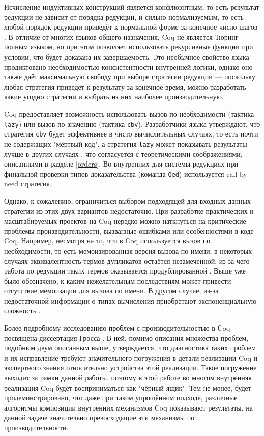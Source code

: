 \documentclass[../diploma.tex]{subfiles}
\begin{document}
Исчисление индуктивных конструкций является конфлюэнтным, то есть результат редукции не зависит от порядка редукции, и сильно нормализуемым, то есть любой порядок редукции приведёт к нормальной форме за конечное число шагов \cite{cic_proofs}. В отличие от многих языков общего назначения, Coq не является Тюринг-полным языком, но при этом позволяет использовать рекурсивные функции при условии, что будет доказана их завершаемость. Это необычное свойство языка продиктовано необходимостью консистентности внутренней логики, однако оно также даёт максимальную свободу при выборе стратегии редукции --- поскольку любая стратегия приведёт к результату за конечное время, можно разработать какие угодно стратегии и выбрать из них наиболее производительную.

Coq предоставляет возможность использовать вызов по необходимости (тактика \\\texttt{lazy}) или вызов по значению (тактика \texttt{cbv}). Разработчики языка утверждают, что стратегия \texttt{cbv} будет эффективнее в чисто вычислительных случаях, то есть почти не содержащих "мёртвый код", а стратегия \texttt{lazy} может показывать результаты лучше в других случаях \cite{coq}, что согласуется с теоретическими соображениями, описанными в разделе \ref{orders}. Во внутренних для системы редукциях при финальной проверки типов доказательства (команда \texttt{Qed}) используется call-by-need стратегия.

Однако, к сожалению, ограничиться выбором подходящей для входных данных стратегии из этих двух вариантов недостаточно. При разработке практических и масштабируемых проектов на Coq нередко можно наткнуться на критические проблемы производительности, вызванные ошибками или особенностями в коде Coq. Например, несмотря на то, что в Coq используется вызов по необходимости, то есть мемоизированная версия вызова по имени, в некоторых случаях эквивалентность термов-дупликатов остаётся незамеченной, из-за чего работа по редукции таких термов оказывается продублированной \cite{sharing_bug}. Выше уже было обозначено, к каким нежелательным последствиям может привести отсутствие мемоизации для вызова по имени. В другом случае, из-за недостаточной информации о типах вычисления приобретают экспоненциальную сложность \cite{letform_bug}.

Более подробному исследованию проблем с производительностью в Coq посвящена диссертация Гросса \cite{gross_phd}. В ней, помимо описания множества проблем, подобным двум описанным выше, утверждается, что диагностика таких проблем и их исправление требуют значительного погружения в детали реализации Coq и экспертного знания относительно устройства этой реализации. Такое погружение выходит за рамки данной работы, поэтому в этой работе во многом внутренняя реализация Coq будет восприниматься как "чёрный ящик". Тем не менее, будет продемонстрировано, что даже при таком упрощённом подходе, различные алгоритмы композиции внутренних механизмов Coq показывают результаты, на данной задаче значительно превосходящие эти механизмы по производительности.
\end{document}
